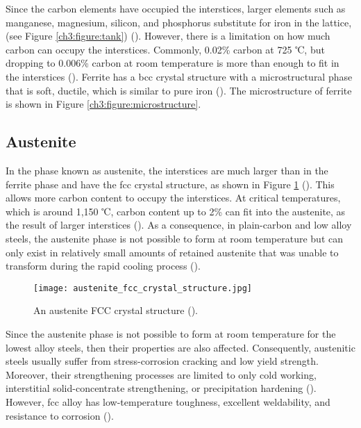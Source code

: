  Since the carbon elements have occupied the interstices, larger elements such as manganese, magnesium, silicon, and phosphorus substitute for iron in the lattice, (see Figure \ref{ch3:figure:tank}) (\cite{jones2012engineering}).  However, there is a limitation on how much carbon can occupy the interstices. Commonly, 0.02\% carbon at 725 ℃, but dropping to 0.006\% carbon at room temperature is more than enough to fit in the interstices (\cite{bhadeshia2017steels}). Ferrite has a bcc crystal structure with a microstructural phase that is soft, ductile, which is similar to pure iron (\cite{bajaj2020steels}). The microstructure of ferrite is shown in Figure \ref{ch3:figure:microstructure}.

\subsection{Austenite} 
In the phase known as austenite, the interstices are much larger than in the ferrite phase and have the \acrshort{fcc} crystal structure, as shown in Figure \ref{ch3:figure:austenite} (\cite{bajaj2020steels}). This allows more carbon content to occupy the interstices. At critical temperatures, which is around 1,150 ℃, carbon content up to 2\% can fit into the austenite, as the result of larger interstices (\cite{bhadeshia2017steels}). As a consequence, in plain-carbon and low alloy steels, the austenite phase is not possible to form at room temperature but can only exist in relatively small amounts of retained austenite that was unable to transform during the rapid cooling process (\cite{molabe2018determining}).

\begin{figure}[H]
    \centering
    \texttt{[image: austenite\_fcc\_crystal\_structure.jpg]}
    \caption{An austenite FCC crystal structure (\cite{bajaj2020steels}).}
    \label{ch3:figure:austenite}
\end{figure}

Since the austenite phase is not possible to form at room temperature for the lowest alloy steels, then their properties are also affected. Consequently, austenitic steels usually suffer from stress-corrosion cracking and low yield strength. Moreover, their strengthening processes are limited to only cold working, interstitial solid-concentrate strengthening, or precipitation hardening (\cite{molabe2018determining}). However, \acrshort{fcc} alloy has low-temperature toughness, excellent weldability, and resistance to corrosion (\cite{bhadeshia2017steels}).


